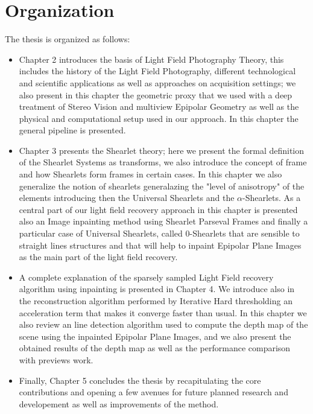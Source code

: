\section{Organization}

The thesis is organized as follows:

\begin{itemize}
\item Chapter 2 introduces the basis of Light Field Photography Theory, this includes the history of the Light Field Photography, different technological and scientific applications as well as approaches on acquisition settings; we also present in this chapter the geometric proxy that we used with a deep treatment of Stereo Vision and multiview Epipolar Geometry as well as the physical and computational setup used in our approach. In this chapter the general pipeline is presented. 

\item Chapter 3 presents the Shearlet theory; here we present the formal definition of the Shearlet Systems as transforms, we also introduce the concept of frame and how Shearlets form frames in certain cases. In this chapter we also generalize the notion of shearlets generalazing the "level of anisotropy" of the elements  introducing then the Universal Shearlets and the $\alpha$-Shearlets. As a central part of our light field recovery approach in this chapter is presented also an Image inpainting method using Shearlet Parseval Frames and finally a particular case of Universal Shearlets, called $0$-Shearlets that are sensible to straight lines structures and that will help to inpaint Epipolar Plane Images as the main part of the light field recovery. 

\item A complete explanation of the sparsely sampled Light Field recovery algorithm using inpainting is presented in Chapter 4. We introduce also in the reconstruction algorithm performed by Iterative Hard thresholding an acceleration term that makes it converge faster than usual. In this chapter we also review an line detection algorithm used to compute the depth map of the scene using the inpainted Epipolar Plane Images, and we also present the obtained results of the depth map as well as the performance comparison with previews work. 

\item Finally, Chapter 5 concludes the thesis by recapitulating the core contributions and opening a few avenues for future planned research and developement as well as improvements of the method. 
\end{itemize}
